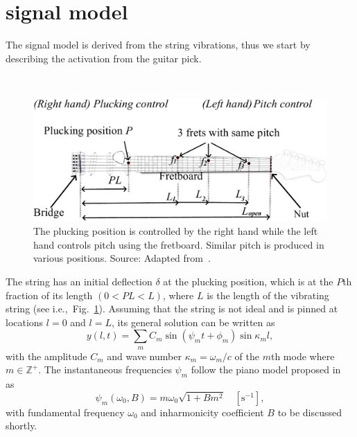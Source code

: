 
\section{signal model}
The signal model is derived from the string vibrations, thus we start by describing the activation from the guitar pick. 
%
\begin{figure}[h!]\
  \centering
  \centerline{\includegraphics[width=1\columnwidth]{img/fender_drawing4.png}}
  \caption{The plucking position is controlled by the right hand while the left hand controls pitch using the fretboard. Similar pitch is produced in various positions. Source: Adapted from~\cite{phillips}.
  }\label{fig:guitar_overview}\vspace{-2mm}
\end{figure}
%
The string has an initial deflection $\delta$ at the plucking position, which is at the $P$th fraction of its length $(0<PL<L)$, where $L$ is the length of the vibrating string (see i.e.,~Fig.~\ref{fig:guitar_overview}). 
%
Assuming that the string is not ideal and is pinned at locations $l=0$ and $l=L$, its general solution can be written as~\cite{fletcher:physics_of_musical_instruments}
%
\begin{equation}\label{eq:modalSum}
    y(l,t) = \sum_m C_m\sin(\psi_mt+\phi_m)\sin\kappa_ml,
\end{equation}
%
with the amplitude $C_m$ and wave number $\kappa_m = \omega_m / c$ of the $m$th mode where $m\in \mathbb{Z}^+$. The instantaneous frequencies $\psi_m$ follow the piano model proposed in~\cite{fletcher:piano_model} as 
\begin{equation}\label{eq:pianoModel}
  \psi_m(\omega_0,B) = m \omega_0 \sqrt{1+B m^2} \quad [\text{s}^{-1}], 
\end{equation}
with fundamental frequency $\omega_0$ and inharmonicity coefficient $B$ to be discussed shortly. 

